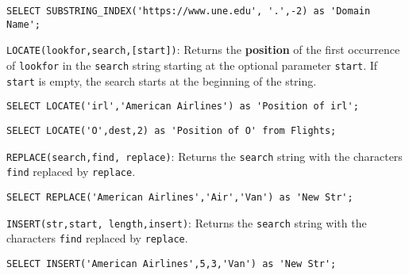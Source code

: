 \documentclass{article}
\begin{document}
\begin{outline}
\begin{lstlisting}[frame=single]  
SELECT SUBSTRING_INDEX('https://www.une.edu', '.',-2) as 'Domain Name';
\end{lstlisting}


 
   


      
   \1 \texttt{LOCATE(lookfor,search,[start])}: Returns the \textbf{position} of the first occurrence of \texttt{lookfor} in the \texttt{search} string starting at the optional parameter \texttt{start}.  If \texttt{start} is empty, the search starts at the beginning of the string.  
       
\begin{lstlisting}[frame=single]  
SELECT LOCATE('irl','American Airlines') as 'Position of irl';
\end{lstlisting}

   
      
\begin{lstlisting}[frame=single]  
 SELECT LOCATE('O',dest,2) as 'Position of O' from Flights;
\end{lstlisting}

   
   
   
   
   
   
   
      
   \1 \texttt{REPLACE(search,find, replace)}: Returns the \texttt{search} string with the characters \texttt{find} replaced by \texttt{replace}.  
       
\begin{lstlisting}[frame=single]  
SELECT REPLACE('American Airlines','Air','Van') as 'New Str';
\end{lstlisting}

    
    
    

   
      
   \1 \texttt{INSERT(str,start, length,insert)}: Returns the \texttt{search}
string with the characters \texttt{find} replaced by \texttt{replace}.  
       
\begin{lstlisting}[frame=single]  
SELECT INSERT('American Airlines',5,3,'Van') as 'New Str';
\end{lstlisting}

    
    

\end{outline}
\end{document}

